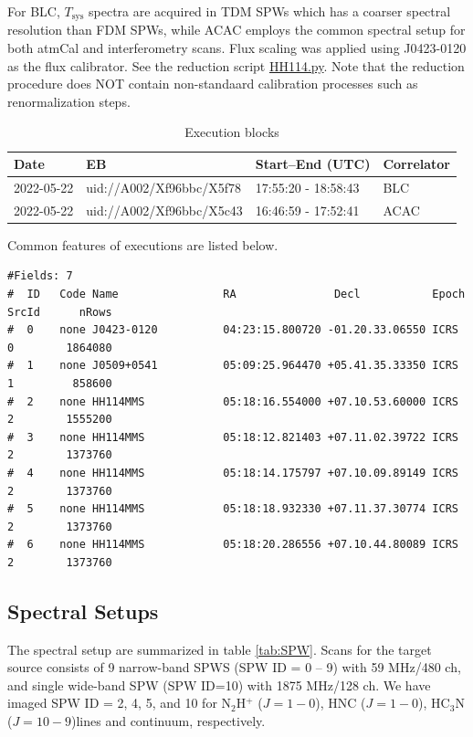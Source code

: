 \documentclass[a4paper, 10pt]{scrartcl}
\begin{document}
For BLC, $T_{\mathrm{sys}}$ spectra are acquired in TDM SPWs which has a coarser spectral resolution than FDM SPWs, while ACAC employs the common spectral setup for both atmCal and interferometry scans.
Flux scaling was applied using J0423-0120 as the flux calibrator.
See the reduction script \href{https://jira.alma.cl/secure/attachment/457290/HH114.py}{HH114.py}.
Note that the reduction procedure does NOT contain non-standaard calibration processes such as renormalization steps.

\begin{table}[h]
\centering
\caption{Execution blocks}
\label{tab:EBlist}
\begin{tabular}{llll} \hline \hline
Date        & EB                       & Start--End (UTC)    & Correlator \\ \hline 
2022-05-22  & uid://A002/Xf96bbc/X5f78 & 17:55:20 - 18:58:43 & BLC        \\
2022-05-22  & uid://A002/Xf96bbc/X5c43 & 16:46:59 - 17:52:41 & ACAC       \\ \hline
\end{tabular}
\end{table}

Common features of executions are listed below.
\footnotesize
\begin{verbatim}
#Fields: 7
#  ID   Code Name                RA               Decl           Epoch   SrcId      nRows
#  0    none J0423-0120          04:23:15.800720 -01.20.33.06550 ICRS    0        1864080
#  1    none J0509+0541          05:09:25.964470 +05.41.35.33350 ICRS    1         858600
#  2    none HH114MMS            05:18:16.554000 +07.10.53.60000 ICRS    2        1555200
#  3    none HH114MMS            05:18:12.821403 +07.11.02.39722 ICRS    2        1373760
#  4    none HH114MMS            05:18:14.175797 +07.10.09.89149 ICRS    2        1373760
#  5    none HH114MMS            05:18:18.932330 +07.11.37.30774 ICRS    2        1373760
#  6    none HH114MMS            05:18:20.286556 +07.10.44.80089 ICRS    2        1373760
\end{verbatim}

\normalsize
\subsection{Spectral Setups}
The spectral setup are summarized in table \ref{tab:SPW}. Scans for the target source consists of 9 narrow-band SPWS (SPW ID = 0 -- 9) with 59 MHz/480 ch, and single wide-band SPW (SPW ID=10) with 1875 MHz/128 ch. We have imaged SPW ID = 2, 4, 5, and 10 for N$_2$H$^+$ ($J=1-0$), HNC ($J=1-0$), HC$_3$N ($J=10-9$)lines and continuum, respectively.
\end{document}
